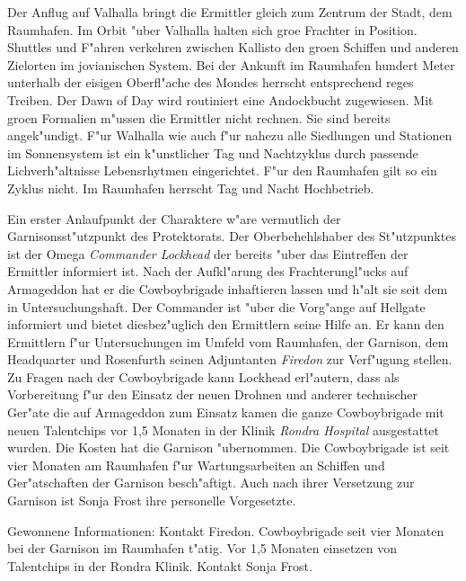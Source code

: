 Der Anflug auf Valhalla bringt die Ermittler gleich zum Zentrum der Stadt, dem Raumhafen. Im Orbit "uber Valhalla halten sich gro\3e Frachter in Position. Shuttles und F"ahren verkehren zwischen Kallisto den gro\3en Schiffen und anderen Zielorten im jovianischen System. Bei der Ankunft im Raumhafen hundert Meter unterhalb der eisigen Oberfl"ache des Mondes herrscht entsprechend reges Treiben. Der Dawn of Day wird routiniert eine Andockbucht zugewiesen. Mit gro\3en Formalien m"ussen die Ermittler nicht rechnen. Sie sind bereits angek"undigt. F"ur Walhalla wie auch f"ur nahezu alle Siedlungen und Stationen im Sonnensystem ist ein k"unstlicher Tag und Nachtzyklus durch passende Lichverh"altnisse Lebensrhytmen eingerichtet. F"ur den Raumhafen gilt so ein Zyklus nicht. Im Raumhafen herrscht Tag und Nacht Hochbetrieb. 



Ein erster Anlaufpunkt der Charaktere w"are vermutlich der Garnisonsst"utzpunkt des Protektorats. Der Oberbehehlshaber des St"utzpunktes ist der Omega \emph{Commander Lockhead} der bereits "uber das Eintreffen der Ermittler informiert ist. Nach der Aufkl"arung des Frachterungl"ucks auf Armageddon hat er die Cowboybrigade inhaftieren lassen und h"alt sie seit dem in Untersuchungshaft. Der Commander ist "uber die Vorg"ange auf Hellgate informiert und bietet diesbez"uglich den Ermittlern seine Hilfe an. Er kann den Ermittlern f"ur Untersuchungen im Umfeld vom Raumhafen, der Garnison, dem Headquarter und Rosenfurth seinen Adjuntanten \emph{Firedon} zur Verf"ugung stellen. Zu Fragen nach der Cowboybrigade kann Lockhead erl"autern, dass als Vorbereitung f"ur den Einsatz der neuen Drohnen und anderer technischer Ger"ate die auf Armageddon zum Einsatz kamen die ganze Cowboybrigade mit neuen Talentchips vor 1,5 Monaten in der Klinik \emph{Rondra Hospital} ausgestattet wurden. Die Kosten hat die Garnison "ubernommen. Die Cowboybrigade ist seit vier Monaten am Raumhafen f"ur Wartungsarbeiten an Schiffen und Ger"atschaften der Garnison besch"aftigt. Auch nach ihrer Versetzung zur Garnison ist Sonja Frost ihre personelle Vorgesetzte.

\begin{remarks}
	Gewonnene Informationen: Kontakt Firedon. Cowboybrigade seit vier Monaten bei der Garnison im Raumhafen t"atig. Vor 1,5 Monaten einsetzen von Talentchips in der Rondra Klinik. Kontakt Sonja Frost.
\end{remarks}



